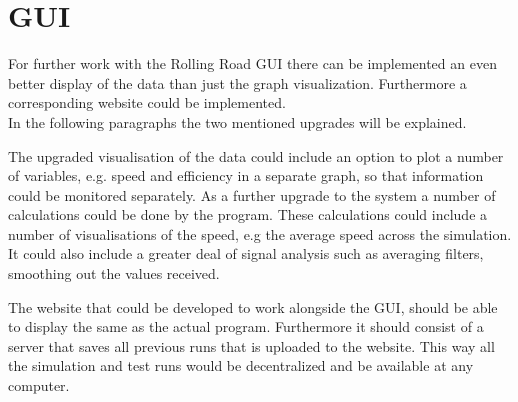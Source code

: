 \section{GUI}
For further work with the Rolling Road GUI there can be implemented an even better display of the data than just the graph visualization. Furthermore a corresponding website could be implemented.\\
In the following paragraphs the two mentioned upgrades will be explained. 

The upgraded visualisation of the data could include an option to plot a number of variables, e.g. speed and efficiency in a separate graph, so that information could be monitored separately. As a further upgrade to the system a number of calculations could be done by the program. These calculations could include a number of visualisations of the speed, e.g the average speed across the simulation. It could also include a greater deal of signal analysis such as averaging filters, smoothing out the values received. 

The website that could be developed to work alongside the GUI, should be able to display the same as the actual program. Furthermore it should consist of a server that saves all previous runs that is uploaded to the website. This way all the simulation and test runs would be decentralized and be available at any computer.  